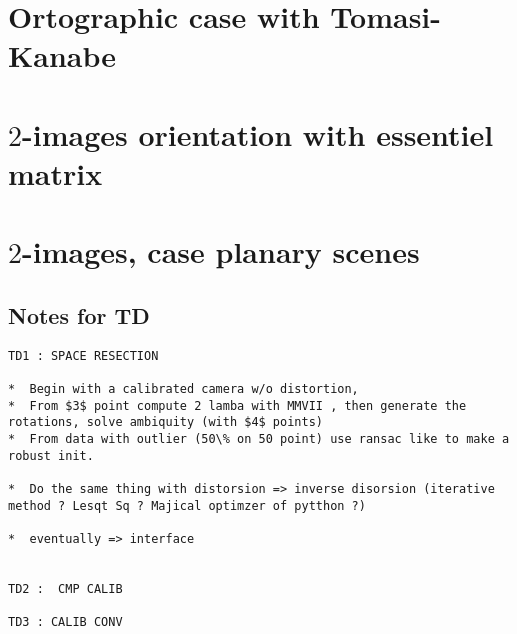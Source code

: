 


\section{Ortographic case with Tomasi-Kanabe}


\section{$2$-images orientation with essentiel matrix}


\section{$2$-images, case planary scenes}



\subsection{Notes for TD}


\begin{verbatim}
TD1 : SPACE RESECTION

*  Begin with a calibrated camera w/o distortion,
*  From $3$ point compute 2 lamba with MMVII , then generate the rotations, solve ambiquity (with $4$ points)
*  From data with outlier (50\% on 50 point) use ransac like to make a robust init.

*  Do the same thing with distorsion => inverse disorsion (iterative method ? Lesqt Sq ? Majical optimzer of pytthon ?)

*  eventually => interface


TD2 :  CMP CALIB

TD3 : CALIB CONV
\end{verbatim}




